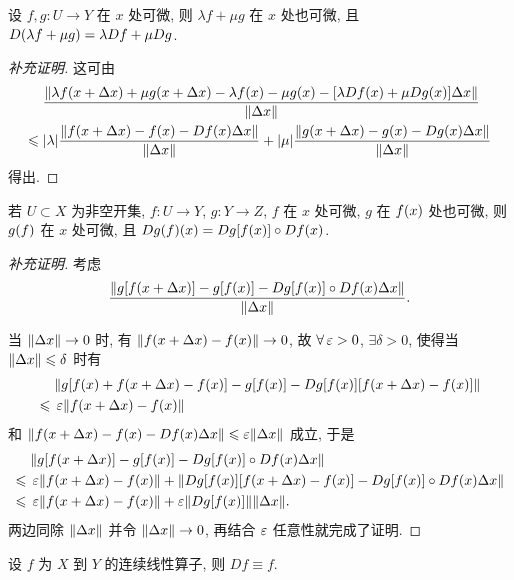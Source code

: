 \begin{proposition}[补充 3]
设 $f,g:U\to Y$ 在 $x$ 处可微, 则 $\lambda f+\mu g$ 在 $x$ 处也可微, 且 $D\xk{\lambda f+\mu g}=\lambda Df+\mu Dg$.
\end{proposition}
\begin{proof}[补充证明]
这可由
\begin{align*}
&\;\frac{\fs{\lambda f\xk{x+\Delta x}+\mu g\xk{x+\Delta x}-\lambda f\xk{x}-\mu g\xk{x}-\zk{\lambda Df\xk{x}+\mu Dg\xk{x}}\Delta x}}{\fs{\Delta x}}\\
\leq&\;\jd{\lambda}\frac{\fs{f\xk{x+\Delta x}-f\xk{x}-Df\xk{x}\Delta x}}{\fs{\Delta x}}+\jd{\mu}\frac{\fs{g\xk{x+\Delta x}-g\xk{x}-Dg\xk{x}\Delta x}}{\fs{\Delta x}}
\end{align*}
得出.
\end{proof}
\begin{proposition}[补充 4]
若 $U\subset X$ 为非空开集, $f:U\to Y$, $g:Y\to Z$, $f$ 在 $x$ 处可微, $g$ 在 $f\xk{x}$ 处也可微, 则 $g\xk{f}$ 在 $x$ 处可微, 且 $Dg\xk{f}\xk{x}=Dg\zk{f\xk{x}}\circ Df\xk{x}$.
\end{proposition}
\begin{proof}[补充证明]
考虑
\[\frac{\fs{g\zk{f\xk{x+\Delta x}}-g\zk{f\xk{x}}-Dg\zk{f\xk{x}}\circ Df\xk{x}\Delta x}}{\fs{\Delta x}}.\]

当 $\left\Vert\Delta x\right\Vert\to 0$ 时, 有 $\fs{f\xk{x+\Delta x}-f\xk{x}}\to 0$, 故 $\forall \eps>0$, $\exists\delta>0$, 使得当 $\left\Vert\Delta x\right\Vert\leqslant\delta$ 时有
\begin{align*}
&\; \fs{g\zk{f\xk{x}+f\xk{x+\Delta x}-f\xk{x}}-g\zk{f\xk{x}}-Dg\zk{f\xk{x}}\zk{f\xk{x+\Delta x}-f\xk{x}}}\\
\leq &\; \eps\fs{f\xk{x+\Delta x}-f\xk{x}}
\end{align*}
和 $\fs{f\xk{x+\Delta x}-f\xk{x}-Df\xk{x}\Delta x}\leq\eps\fs{\Delta x}$ 成立, 于是
\begin{align*}
&\; \fs{g\zk{f\xk{x+\Delta x}}-g\zk{f\xk{x}}-Dg\zk{f\xk{x}}\circ Df\xk{x}\Delta x}\\
\leq &\; \eps\fs{f\xk{x+\Delta x}-f\xk{x}}+\fs{Dg\zk{f\xk{x}}\zk{f\xk{x+\Delta x}-f\xk{x}}-Dg\zk{f\xk{x}}\circ Df\xk{x}\Delta x}\\
\leq &\; \eps\fs{f\xk{x+\Delta x}-f\xk{x}}+\eps\fs{Dg\zk{f\xk{x}}}\fs{\Delta x}.
\end{align*}
两边同除 $\left\Vert\Delta x\right\Vert$ 并令 $\left\Vert\Delta x\right\Vert\to 0$, 再结合 $\operatorname{\varepsilon}$ 任意性就完成了证明.
\end{proof}
\begin{proposition}[补充 5]
设 $f$ 为 $X$ 到 $Y$ 的连续线性算子, 则 $Df\equiv f$.
\end{proposition}
